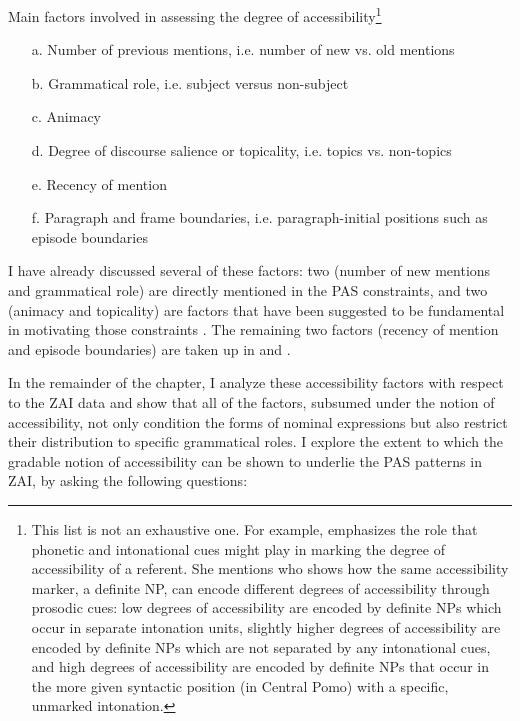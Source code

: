 \ea\label{accessibilityfactors}  Main factors involved in assessing the degree of accessibility\footnote{This list is not an exhaustive one. For example, \citet[50]{ariel2001} emphasizes the role that phonetic and intonational cues might play in marking the degree of accessibility of a referent. She mentions \citet{mithun1995} who shows how the same accessibility marker, a definite NP, can encode different degrees of accessibility through prosodic cues: low degrees of accessibility are encoded by definite NPs which occur in separate intonation units, slightly higher degrees of accessibility are encoded by definite NPs which are not separated by any intonational cues, and high degrees of accessibility are encoded by definite NPs that occur in the more given syntactic position (in Central Pomo) with a specific, unmarked intonation.} \citep{ariel1990,ariel2001}

\begin{itemize}
\item[a.] Number of previous mentions, i.e. number of new vs. old mentions
\item[b.] Grammatical role, i.e. subject versus non-subject
\item[c.] Animacy
\item[d.] Degree of discourse salience or topicality, i.e. topics vs. non-topics 
\item[e.] Recency of mention
\item[f.] Paragraph and frame boundaries, i.e. paragraph-initial positions such as episode boundaries
\end{itemize}
\z
 
I have already discussed several of these factors: two (number of new mentions and grammatical role) are directly mentioned in the PAS constraints, and two (animacy and topicality) are factors that have been suggested to be fundamental in motivating those constraints \citep{haspelmath2006,everett2009}. The remaining two factors (recency of mention and episode boundaries) are taken up in  and . 

In the remainder of the chapter, I analyze these accessibility factors with respect to the ZAI data and show that all of the factors, subsumed under the notion of accessibility, not only condition the forms of nominal expressions but also restrict their distribution to specific grammatical roles. I explore the extent to which the gradable notion of accessibility can be shown to underlie the PAS patterns in ZAI, by asking the following questions:

